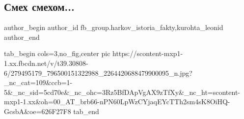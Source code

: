  
 
 
 
 
 
\subsection{Смех смехом...}
\label{sec:28_04_2022.fb.fb_group.harkov_istoria_fakty.1.smeh_smehom}
 
\ifcmt
 author_begin
   author_id fb_group.harkov_istoria_fakty,kurohta_leonid
 author_end
\fi

\ifcmt
  tab_begin cols=3,no_fig,center
     pic https://scontent-mxp1-1.xx.fbcdn.net/v/t39.30808-6/279495179_796500151322988_2264420688479900095_n.jpg?_nc_cat=109&ccb=1-5&_nc_sid=5cd70e&_nc_ohc=3Rz5BfDApVgAX9zTfXy&_nc_ht=scontent-mxp1-1.xx&oh=00_AT_brb66-nPN60LpWzCYjaqEYcTTh2sm4sK8OiHQ-GcsbA&oe=626F27F8
  tab_end
\fi
